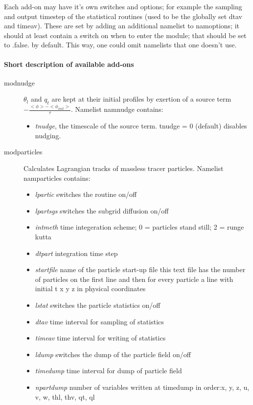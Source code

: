 \documentclass[a4paper,10pt]{article}
\begin{document}
Each add-on may have it's own switches and options; for example the sampling and output timestep of the statistical routines (used to be the globally set dtav and timeav). These are set by adding an additional namelist to namoptions; it should at least contain a switch on when to enter the module; that should be set to .false. by default. This way, one could omit namelists that one doesn't use.
\paragraph{Short description of available add-ons}
\begin{description}
 \item [modnudge] $\theta_l$ and $q_t$ are kept at their initial profiles by exertion of a source term $-\frac{<{\phi}> - <{\phi}_{init}>}{\tau}$. Namelist namnudge contains:
\begin{itemize}
 \item\textit{tnudge}, the timescale of the source term. tnudge = 0 (default) disables nudging.
\end{itemize}
 \item [modparticles] Calculates Lagrangian tracks of massless tracer particles. Namelist namparticles contains: \begin{itemize}
 \item \textit{lpartic}        switches the routine on/off
\item  \textit{lpartsgs}       switches the subgrid diffusion on/off
\item  \textit{intmeth}        time integeration scheme; 0 = particles stand still;  2 = runge kutta
\item  \textit{dtpart}         integration time step
\item  \textit{startfile}      name of the particle start-up file this text file has the number of particles on the first line and then for every particle a line with initial t x y z in physical coordinates
\item \textit{lstat}         switches the particle statistics on/off
\item  \textit{dtav}           time interval for sampling of statistics
\item  \textit{timeav}         time interval for writing of statistics
\item \textit{ldump}         switches the dump of the particle field on/off
\item  \textit{timedump}       time interval for dump of particle field
\item  \textit{npartdump}      number of variables written at timedump in order:x, y, z, u, v, w, thl, thv, qt, ql

\end{itemize}
\end{description}
\end{document}
